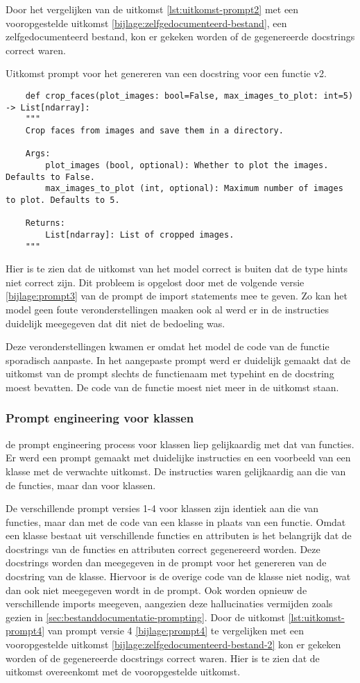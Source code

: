 Door het vergelijken van de uitkomst \ref{lst:uitkomst-prompt2} met een vooropgestelde uitkomst \ref{bijlage:zelfgedocumenteerd-bestand}, een zelfgedocumenteerd bestand, kon er gekeken worden of de gegenereerde docstrings correct waren.
\begin{listing}
    \caption{Uitkomst prompt voor het genereren van een docstring voor een functie v2.}
    \label{lst:uitkomst-prompt2}
    \begin{verbatim}
    def crop_faces(plot_images: bool=False, max_images_to_plot: int=5) -> List[ndarray]:
    """
    Crop faces from images and save them in a directory.

    Args:
        plot_images (bool, optional): Whether to plot the images. Defaults to False.
        max_images_to_plot (int, optional): Maximum number of images to plot. Defaults to 5.

    Returns:
        List[ndarray]: List of cropped images.
    """
    \end{verbatim}
\end{listing}
Hier is te zien dat de uitkomst van het model correct is buiten dat de type hints niet correct zijn. 
Dit probleem is opgelost door met de volgende versie \ref{bijlage:prompt3} van de prompt de import statements mee te geven.
Zo kan het model geen foute veronderstellingen maaken ook al werd er in de instructies duidelijk meegegeven dat dit niet de bedoeling was.

Deze veronderstellingen kwamen er omdat het model de code van de functie sporadisch aanpaste.
In het aangepaste prompt werd er duidelijk gemaakt dat de uitkomst van de prompt slechts de functienaam met typehint en de docstring moest bevatten.
De code van de functie moest niet meer in de uitkomst staan.

\subsubsection{Prompt engineering voor klassen}
de prompt engineering process voor klassen liep gelijkaardig met dat van functies.
Er werd een prompt gemaakt met duidelijke instructies en een voorbeeld van een klasse met de verwachte uitkomst.
De instructies waren gelijkaardig aan die van de functies, maar dan voor klassen.

De verschillende prompt versies 1-4 voor klassen zijn identiek aan die van functies, maar dan met de code van een klasse in plaats van een functie.
Omdat een klasse bestaat uit verschillende functies en attributen is het belangrijk dat de docstrings van de functies en attributen correct gegenereerd worden.
Deze docstrings worden dan meegegeven in de prompt voor het genereren van de docstring van de klasse.
Hiervoor is de overige code van de klasse niet nodig, wat dan ook niet meegegeven wordt in de prompt.
Ook worden opnieuw de verschillende imports meegeven, aangezien deze hallucinaties vermijden zoals gezien in \ref{sec:bestanddocumentatie-prompting}.
Door de uitkomst \ref{lst:uitkomst-prompt4} van prompt versie 4 \ref{bijlage:prompt4} te vergelijken met een vooropgestelde uitkomst \ref{bijlage:zelfgedocumenteerd-bestand-2} kon er gekeken worden of de gegenereerde docstrings correct waren.
Hier is te zien dat de uitkomst overeenkomt met de vooropgestelde uitkomst. 

